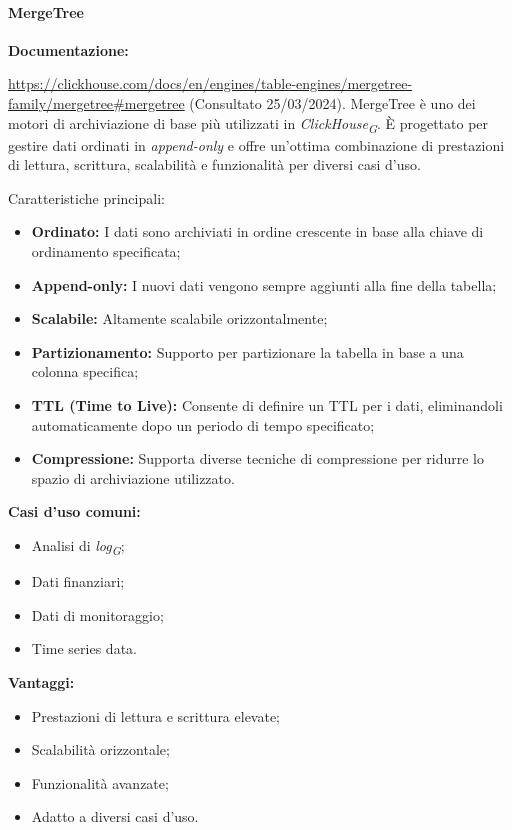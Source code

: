 \paragraph{MergeTree}\label{sec:MergeTree}
\textbf{Documentazione:}

\url{https://clickhouse.com/docs/en/engines/table-engines/mergetree-family/mergetree#mergetree} (Consultato 25/03/2024).\newline
MergeTree è uno dei motori di archiviazione di base più utilizzati in \textit{ClickHouse}\textsubscript{\textit{G}}. È progettato per gestire dati ordinati in \textit{append-only} e offre un'ottima combinazione di prestazioni di lettura, scrittura, scalabilità e funzionalità per diversi casi d'uso.

Caratteristiche principali:
\begin{itemize}
	\item \textbf{Ordinato:} I dati sono archiviati in ordine crescente in base alla chiave di ordinamento specificata;
	\item \textbf{Append-only:} I nuovi dati vengono sempre aggiunti alla fine della tabella;
	\item \textbf{Scalabile:} Altamente scalabile orizzontalmente;
	\item \textbf{Partizionamento:} Supporto per partizionare la tabella in base a una colonna specifica;
	\item \textbf{TTL (Time to Live):} Consente di definire un TTL per i dati, eliminandoli automaticamente dopo un periodo di tempo specificato;
	\item \textbf{Compressione:} Supporta diverse tecniche di compressione per ridurre lo spazio di archiviazione utilizzato.
\end{itemize}

\textbf{Casi d'uso comuni:}
\begin{itemize}
  \item Analisi di \textit{log}\textsubscript{\textit{G}};
  \item Dati finanziari;
  \item Dati di monitoraggio;
  \item Time series data.
\end{itemize}

\textbf{Vantaggi:}
\begin{itemize}
  \item Prestazioni di lettura e scrittura elevate;
  \item Scalabilità orizzontale;
  \item Funzionalità avanzate;
  \item Adatto a diversi casi d'uso.
\end{itemize}

